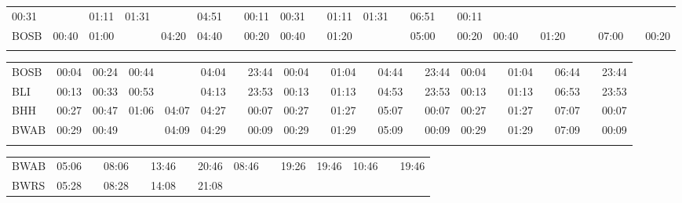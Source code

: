 \begin{center}
\begin{tabular}
\begin{tabular}
\begin{tabular}{!{\color{blaulila}\vrule width 3pt}l!{\color{blaulila}\vrule width 3pt}*{6}{c|}c!{\color{blaulila}\vrule width 3pt}*{2}{*{7}{c|}c!{\color{blaulila}\vrule width 3pt}}}
00:31 & \bli{}   & 01:11 & 01:31 & \bli{}   & 04:51 & \bli{}   & 00:11 &
00:31 & \bli{}   & 01:11 & 01:31 & \bli{}   & 06:51 & \bli{}   & 00:11 \\
BOSB     &
00:40 & 01:00 &       & 04:20 & 04:40 & \bli{}   & 00:20 &
00:40 & \bli{}   & 01:20 &       &          & 05:00 & \bli{}   & 00:20 &
00:40 & \bli{}   & 01:20 &       &          & 07:00 & \bli{}   & 00:20 \\
\myhline
\end{tabular}
\begin{tabular}{!{\color{blaulila}\vrule width 3pt}l!{\color{blaulila}\vrule width 3pt}*{3}{*{6}{c|}c!{\color{blaulila}\vrule width 3pt}}}
\hline
{}
 &  &  \\
\hline
BOSB     &
00:04 & 00:24 & 00:44 &       & 04:04 &  & 23:44 &
00:04 &  & 01:04 &          & 04:44 &  & 23:44 &
00:04 &  & 01:04 &          & 06:44 &  & 23:44 \\
BLI      &
00:13 & 00:33 & 00:53 &       & 04:13 & \bli{}   & 23:53 &
00:13 & \bli{}   & 01:13 &  & 04:53 & \bli{}   & 23:53 &
00:13 & \bli{}   & 01:13 &  & 06:53 & \bli{}   & 23:53 \\
BHH      &
00:27 & 00:47 & 01:06 & 04:07 & 04:27 & \bli{}   & 00:07 &
00:27 & \bli{}   & 01:27 & \bli{}   & 05:07 & \bli{}   & 00:07 &
00:27 & \bli{}   & 01:27 & \bli{}   & 07:07 & \bli{}   & 00:07 \\
BWAB     &
00:29 & 00:49 &       & 04:09 & 04:29 & \bli{}   & 00:09 &
00:29 & \bli{}   & 01:29 & \bli{}   & 05:09 & \bli{}   & 00:09 &
00:29 & \bli{}   & 01:29 & \bli{}   & 07:09 & \bli{}   & 00:09 \\
\myhline
\end{tabular}
\fi
\iftapir
\begin{tabular}{!{\color{blaulila}\vrule width 3pt}l!{\color{blaulila}\vrule width 3pt}*{6}{c|}c!{\color{blaulila}\vrule width 3pt}*{3}{c|}c!{\color{blaulila}\vrule width 3pt}*{2}{c|}c!{\color{blaulila}\vrule width 3pt}}
\hline
{}
 &  &  \\
\hline
BWAB     &
05:06 &  & 08:06 &  & 13:46 &  & 20:46 &
08:46 &  & 19:26 & 19:46 &
10:46 &  & 19:46 \\
BWRS     &
05:28 & \bli{}   & 08:28 & \bli{}   & 14:08 & \bli{}   & 21:08 &

\end{tabular}
\end{tabular}
\end{tabular}
\end{center}
